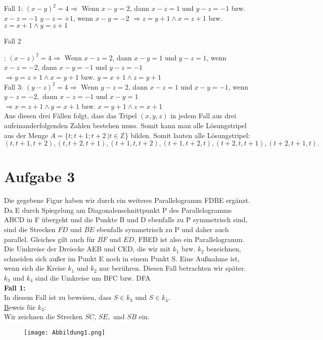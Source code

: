 \documentclass[11pt,a4paper,oneside,]{article}
\begin{document}
Fall 1: $(x-y)^2=4 \Rightarrow$ Wenn $x-y = 2$, dann $x-z = 1 $ und $ y-z = -1$ bzw. $x-z = -1 $ $ y-z = +1$, wenn $x-y = -2$\newline
$\Rightarrow z=y+1 \land x= z+1$ bzw. $z=x+1 \land y=z+1$\\

{\raggedright{Fall 2}}: $(x-z)^2=4 \Rightarrow$ Wenn $x-z = 2$, dann $x-y = 1$ und $y-z = 1$, wenn $x-z = -2$, dann $x-y =-1 $ und $y-z = -1$\\
$\Rightarrow y=z+1 \land x=y+1$ bzw. $y=x+1 \land z=y+1$\\

Fall 3: $(y-z)^2 = 4 \Rightarrow$ Wenn $y-z = 2$, dann $x-z = 1$ und $x-y = -1$, wenn $y-z=-2, $ dann $ x-z = -1$ und $x-y = 1$\\
$\Rightarrow x=z+1 \land y=x+1$ bzw. $x=y+1 \land z=x+1$\\

Aus diesen drei Fällen folgt, dass das Tripel $(x,y,z)$ in jedem Fall aus drei aufeinanderfolgenden Zahlen bestehen muss.
Somit kann man alle Lösungstripel aus der Menge $A = \{t; t+1; t+2\ | t\in \mathbb{Z}$\} bilden.
Somit lauten alle Lösungstripel:\\
$(t,t+1,t+2),(t,t+2,t+1),(t+1,t,t+2),(t+1,t+2,t),(t+2,t,t+1),(t+2,t+1,t).$\\
\newpage
\section{Aufgabe 3}
Die gegebene Figur haben wir durch ein weiteres Parallelogramm FDBE ergänzt. Da E durch Spiegelung am Diagonalenschnittpunkt P des Parallelogramms ABCD in F übergeht und die Punkte B und D ebenfalls zu P symmetrisch sind, sind die Strecken $\overline{FD}$ und $\overline{BE}$ ebenfalls symmetrisch zu P und daher auch parallel. Gleiches gilt auch für $\overline{BF}$ und $\overline{ED}$, FBED ist also ein Parallelogramm.\\
Die Umkreise der Dreiecke AEB und CED, die wir mit $k_1$ bzw. $k_2$ bezeichnen, schneiden sich außer im Punkt E noch in einem Punkt S. Eine Außnahme ist, wenn sich die Kreise $k_1$ und $k_2$ nur berühren. Diesen Fall betrachten wir später. $k_3$ und $k_4$ sind die Umkreise um BFC bzw. DFA \\

{\bf Fall 1:}\\
In diesem Fall ist zu beweisen, dass $S \in k_3$ und $S \in k_4$. \\
{\underline Beweis für $k_3$:}\\
Wir zeichnen die Strecken $\overline{SC},\, \overline{SE}, $ und $ \overline{SB}  $ ein.
\begin{figure}[h]
    \caption{}
    \texttt{[image: Abbildung1.png]}
    \label{fig:abb1}
\end{figure}\\
\end{document}
